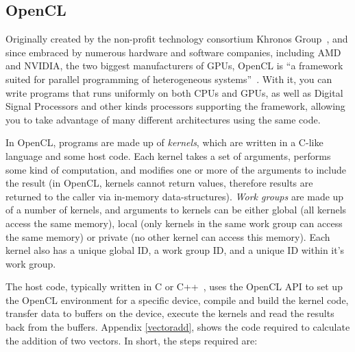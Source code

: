 \subsection{OpenCL}

Originally created by the non-profit technology consortium Khronos
Group~\cite{khronos}, and since embraced by numerous hardware and
software companies, including AMD and NVIDIA, the two biggest
manufacturers of GPUs, OpenCL is ``a framework suited for parallel
programming of heterogeneous systems''~\cite{opencl-quote}. With it,
you can write programs that runs uniformly on both CPUs and GPUs, as
well as Digital Signal Processors and other kinds processors
supporting the framework, allowing you to take advantage of many
different architectures using the same code.

In OpenCL, programs are made up of \emph{kernels}, which are written
in a C-like language and some host code. Each kernel takes a set of
arguments, performs some kind of computation, and modifies one or more
of the arguments to include the result (in OpenCL, kernels cannot
return values, therefore results are returned to the caller via
in-memory data-structures). \emph{Work groups} are made up of a number
of kernels, and arguments to kernels can be either global (all kernels
access the same memory), local (only kernels in the same work group
can access the same memory) or private (no other kernel can access
this memory). Each kernel also has a unique global ID, a work group
ID, and a unique ID within it's work group.

The host code, typically written in C or C++~\cite{hostlang}, uses the
OpenCL API to set up the OpenCL environment for a specific device,
compile and build the kernel code, transfer data to buffers on the
device, execute the kernels and read the results back from the
buffers. Appendix \ref{vectoradd}, shows the code required to
calculate the addition of two vectors. In short, the steps required
are:

